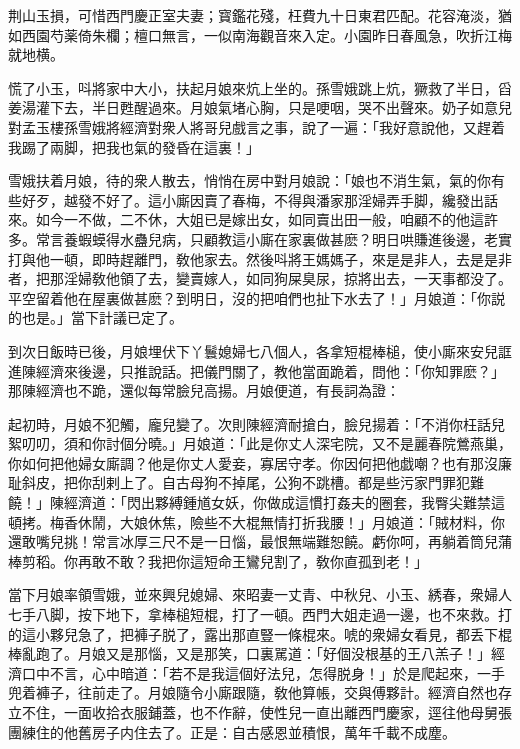 \begin{myquote}
荆山玉損，可惜西門慶正室夫妻；寳鑑花殘，枉費九十日東君匹配。花容淹淡，猶如西園芍薬倚朱欄；檀口無言，一似南海觀音來入定。小園昨日春風急，吹折江梅就地横。
\end{myquote}

慌了小玉，呌將家中大小，扶起月娘來炕上坐的。孫雪娥跳上炕，獗救了半日，舀姜湯灌下去，半日甦醒過來。月娘氣堵心胸，只是哽咽，哭不出聲來。奶子如意兒對孟玉樓孫雪娥將經濟對衆人將哥兒戲言之事，說了一遍：「我好意說他，又趕着我踢了兩脚，把我也氣的發昏在這裏！」

雪娥扶着月娘，待的衆人散去，悄悄在房中對月娘說：「娘也不消生氣，氣的你有些好歹，越發不好了。這小廝因賣了春梅，不得與潘家那淫婦弄手脚，纔發出話來。如今一不做，二不休，大姐已是嫁出女，如同賣出田一般，咱顧不的他這許多。常言養蝦蟆得水蠱兒病，只顧教這小廝在家裏做甚麽？明日哄賺進後邊，老實打與他一頓，即時趕離門，敎他家去。然後呌將王媽媽子，來是是非人，去是是非者，把那淫婦敎他領了去，變賣嫁人，如同狗屎臭尿，掠將出去，一天事都没了。平空留着他在屋裏做甚麽？到明日，沒的把咱們也扯下水去了！」月娘道：「你説的也是。」當下計議已定了。

到次日飯時已後，月娘埋伏下丫鬟媳婦七八個人，各拿短棍棒槌，使小廝來安兒誆進陳經濟來後邊，只推說話。把儀門關了，教他當面跪着，問他：「你知罪麽？」那陳經濟也不跪，還似每常臉兒高揚。月娘便道，有長詞為證：

\begin{myquote}
起初時，月娘不犯觸，龐兒變了。次則陳經濟耐搶白，臉兒揚着：「不消你枉話兒絮叨叨，須和你討個分曉。」月娘道：「此是你丈人深宅院，又不是麗春院鶯燕巢，你如何把他婦女廝調？他是你丈人愛妾，寡居守孝。你因何把他戯嘲？也有那沒廉耻斜皮，把你刮剌上了。自古母狗不掉尾，公狗不跳槽。都是些污家門罪犯難饒！」陳經濟道：「閃出夥縛鍾馗女妖，你做成這慣打姦夫的圈套，我臀尖難禁這頓拷。梅香休鬧，大娘休焦，險些不大棍無情打折我腰！」月娘道：「賊材料，你還敢嘴兒挑！常言冰厚三尺不是一日惱，最恨無端難恕饒。虧你呵，再躺着筒兒蒲棒剪稻。你再敢不敢？我把你這短命王鸞兒割了，敎你直孤到老！」
\end{myquote}

當下月娘率領雪娥，並來興兒媳婦、來昭妻一丈青、中秋兒、小玉、綉春，衆婦人七手八脚，按下地下，拿棒槌短棍，打了一頓。西門大姐走過一邊，也不來救。打的這小夥兒急了，把褲子脱了，露出那直豎一條棍來。唬的衆婦女看見，都丢下棍棒亂跑了。月娘又是那惱，又是那笑，口裏駡道：「好個没根基的王八羔子！」經濟口中不言，心中暗道：「若不是我這個好法兒，怎得脱身！」於是爬起來，一手兜着褲子，往前走了。月娘隨令小廝跟隨，敎他算帳，交與傅夥計。經濟自然也存立不住，一面收拾衣服鋪蓋，也不作辭，使性兒一直出離西門慶家，逕往他母舅張團練住的他舊房子内住去了。正是：自古感恩並積恨，萬年千載不成塵。

